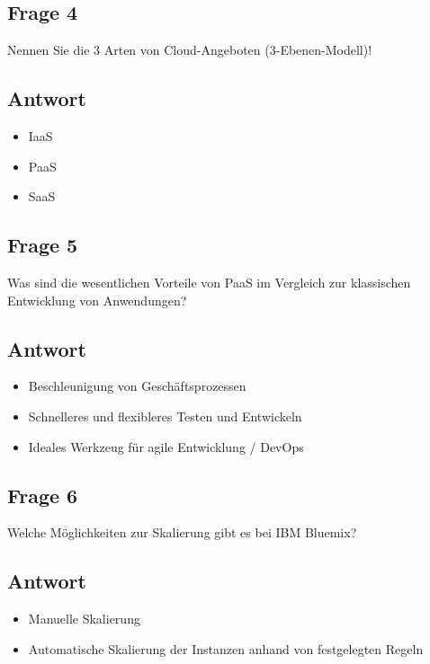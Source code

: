 \subsection*{Frage 4}
Nennen Sie die 3 Arten von Cloud-Angeboten (3-Ebenen-Modell)!
\subsection*{Antwort}
\begin{itemize}
	\item IaaS
	\item PaaS
	\item SaaS
\end{itemize}
\subsection*{Frage 5}
Was sind die wesentlichen Vorteile von PaaS im Vergleich zur klassischen Entwicklung von Anwendungen?
\subsection*{Antwort}
\begin{itemize}
	\item Beschleunigung von Geschäftsprozessen
	\item Schnelleres und flexibleres Testen und Entwickeln
	\item Ideales Werkzeug für agile Entwicklung / DevOps
\end{itemize}
\subsection*{Frage 6}
Welche Möglichkeiten zur Skalierung gibt es bei IBM Bluemix?
\subsection*{Antwort}
\begin{itemize}
	\item Manuelle Skalierung 
	\item Automatische Skalierung der Instanzen anhand von festgelegten Regeln
\end{itemize}
